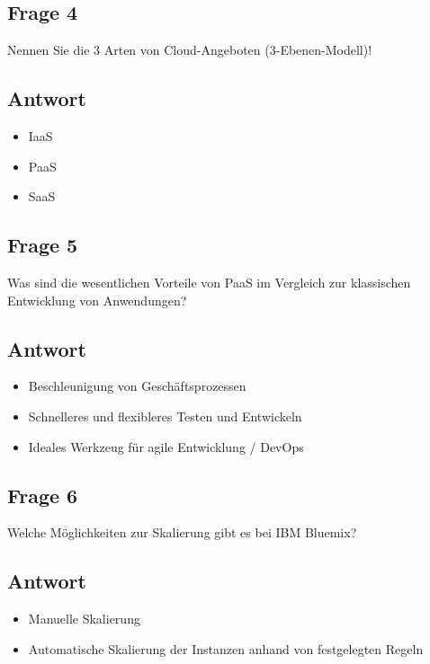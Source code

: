 \subsection*{Frage 4}
Nennen Sie die 3 Arten von Cloud-Angeboten (3-Ebenen-Modell)!
\subsection*{Antwort}
\begin{itemize}
	\item IaaS
	\item PaaS
	\item SaaS
\end{itemize}
\subsection*{Frage 5}
Was sind die wesentlichen Vorteile von PaaS im Vergleich zur klassischen Entwicklung von Anwendungen?
\subsection*{Antwort}
\begin{itemize}
	\item Beschleunigung von Geschäftsprozessen
	\item Schnelleres und flexibleres Testen und Entwickeln
	\item Ideales Werkzeug für agile Entwicklung / DevOps
\end{itemize}
\subsection*{Frage 6}
Welche Möglichkeiten zur Skalierung gibt es bei IBM Bluemix?
\subsection*{Antwort}
\begin{itemize}
	\item Manuelle Skalierung 
	\item Automatische Skalierung der Instanzen anhand von festgelegten Regeln
\end{itemize}
